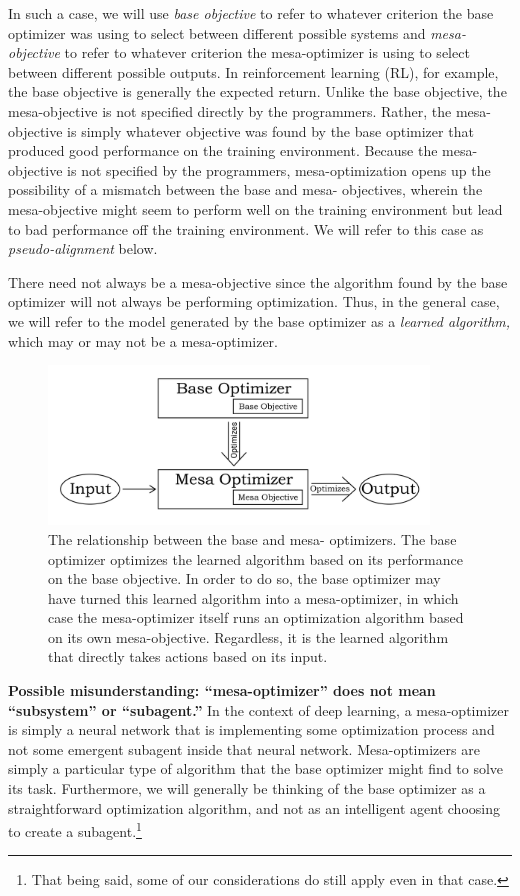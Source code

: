 \documentclass[
  onecolumn,
  natbib,
]{miri-tech-article}
\begin{document}
In such a case, we will use \textit{base objective} to refer to whatever criterion the base optimizer was using to select between different possible systems and \textit{mesa-objective} to refer to whatever criterion the mesa-optimizer is using to select between different possible outputs. In reinforcement learning (RL), for example, the base objective is generally the expected return. Unlike the base objective, the mesa-objective is not specified directly by the programmers. Rather, the mesa-objective is simply whatever objective was found by the base optimizer that produced good performance on the training environment. Because the mesa-objective is not specified by the programmers, mesa-optimization opens up the possibility of a mismatch between the base and mesa- objectives, wherein the mesa-objective might seem to perform well on the training environment but lead to bad performance off the training environment. We will refer to this case as \textit{pseudo-alignment} below.

There need not always be a mesa-objective since the algorithm found by the base optimizer will not always be performing optimization. Thus, in the general case, we will refer to the model generated by the base optimizer as a \textit{learned algorithm,} which may or may not be a mesa-optimizer.

\begin{figure}[h!]
  \centering
  \includegraphics[width=0.9\textwidth]{1_1.jpg}
  \caption{The relationship between the base and mesa- optimizers. The base optimizer optimizes the learned algorithm based on its performance on the base objective. In order to do so, the base optimizer may have turned this learned algorithm into a mesa-optimizer, in which case the mesa-optimizer itself runs an optimization algorithm based on its own mesa-objective. Regardless, it is the learned algorithm that directly takes actions based on its input.}
  \label{fig:1.1}
\end{figure}

\textbf{Possible misunderstanding: ``mesa-optimizer'' does not mean ``subsystem'' or ``subagent.''} In the context of deep learning, a mesa-optimizer is simply a neural network that is implementing some optimization process and not some emergent subagent inside that neural network. Mesa-optimizers are simply a particular type of algorithm that the base optimizer might find to solve its task. Furthermore, we will generally be thinking of the base optimizer as a straightforward optimization algorithm, and not as an intelligent agent choosing to create a subagent.\footnote{That being said, some of our considerations do still apply even in that case.}
\end{document}

